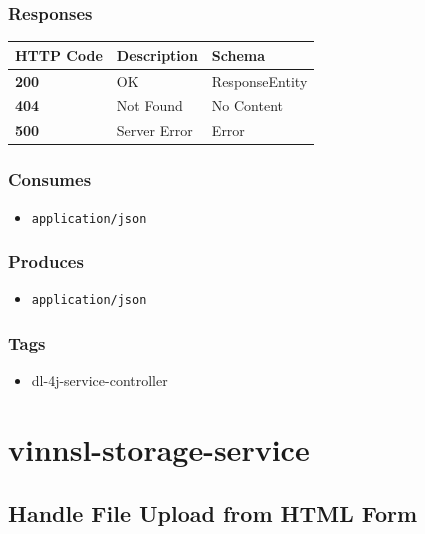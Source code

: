 \subsubsection{Responses}\label{responses-14}

\begin{longtable}[]{@{}lll@{}}
\toprule
HTTP Code & Description & Schema\tabularnewline
\midrule
\endhead
\textbf{200} & OK & ResponseEntity\tabularnewline
\textbf{404} & Not Found & No Content\tabularnewline
\textbf{500} & Server Error & Error\tabularnewline
\bottomrule
\end{longtable}

\subsubsection{Consumes}\label{consumes-7}

\begin{itemize}
\tightlist
\item
  \texttt{application/json}
\end{itemize}

\subsubsection{Produces}\label{produces-14}

\begin{itemize}
\tightlist
\item
  \texttt{application/json}
\end{itemize}

\subsubsection{Tags}\label{tags-14}

\begin{itemize}
\tightlist
\item
  dl-4j-service-controller
\end{itemize}

\section{vinnsl-storage-service}\label{vinnsl-storage-service-1}

\subsection{Handle File Upload from HTML
Form}\label{handle-file-upload-from-html-form}

